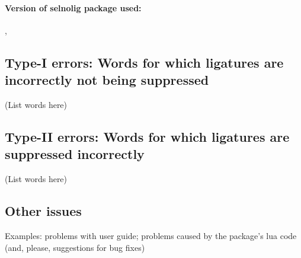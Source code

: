 \documentclass{article}
\begin{document}
\paragraph*{Version of selnolig package used:} 
\pversion, \pdate %


\subsection*{Type-I errors: Words for which ligatures are incorrectly not being suppressed}

(List words here)

\subsection*{Type-II errors: Words for which ligatures are suppressed incorrectly}

(List words here)

\subsection*{Other issues}

Examples: problems with user guide; problems caused by the package's lua code 
(and, please, suggestions for bug fixes)
\end{document}
